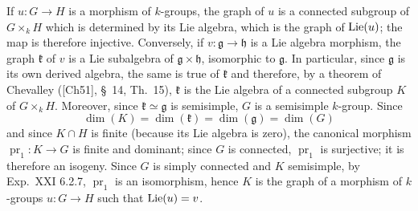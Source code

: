 If $u:G\to H$ is a morphism of $k$-groups, the graph of $u$ is a connected subgroup of $G\times_k H$ which is determined by its Lie algebra, which is the graph of $\operatorname{Lie}(u)$; the map is therefore injective. Conversely, if $v:\mathfrak g\to\mathfrak h$ is a Lie algebra morphism, the graph $\mathfrak k$ of $v$ is a Lie subalgebra of $\mathfrak g\times\mathfrak h$, isomorphic to $\mathfrak g$. In particular, since $\mathfrak g$ is its own derived algebra, the same is true of $\mathfrak k$ and therefore, by a theorem of Chevalley ([Ch51], §~14, Th.~15), $\mathfrak k$ is the Lie algebra of a connected subgroup $K$ of $G\times_k H$.
Moreover, since $\mathfrak k\simeq\mathfrak g$ is semisimple, $G$ is a semisimple $k$-group. Since
\[
\dim(K)=\dim(\mathfrak k)=\dim(\mathfrak g)=\dim(G)
\]
and since $K\cap H$ is finite (because its Lie algebra is zero), the canonical morphism $\operatorname{pr}_1:K\to G$ is finite and dominant; since $G$ is connected, $\operatorname{pr}_1$ is surjective; it is therefore an isogeny. Since $G$ is simply connected and $K$ semisimple, by Exp.~XXI 6.2.7, $\operatorname{pr}_1$ is an isomorphism, hence $K$ is the graph of a morphism of $k$-groups $u:G\to H$ such that $\operatorname{Lie}(u)=v$.

